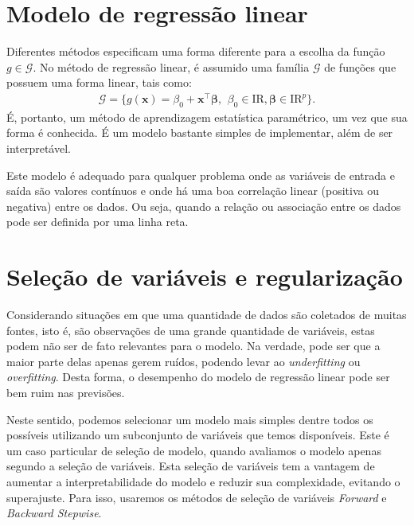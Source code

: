 \documentclass[11pt,]{article}
\begin{document}
\hypertarget{modelo-de-regressuxe3o-linear}{%
\section{Modelo de regressão
linear}\label{modelo-de-regressuxe3o-linear}}

Diferentes métodos especificam uma forma diferente para a escolha da
função \(g \in \mathcal{G}\). No método de regressão linear, é assumido
uma família \(\mathcal{G}\) de funções que possuem uma forma linear,
tais como: \begin{align*}
\mathcal{G} = \{g(\boldsymbol{x}) = \beta_0 + \boldsymbol{x}^\top \boldsymbol{\beta}, \,\ \beta_0 \in \mathrm{I\!R}, \boldsymbol{\beta} \in \mathrm{I\!R}^p \}.
\end{align*} É, portanto, um método de aprendizagem estatística
paramétrico, um vez que sua forma é conhecida. É um modelo bastante
simples de implementar, além de ser interpretável.

Este modelo é adequado para qualquer problema onde as variáveis de
entrada e saída são valores contínuos e onde há uma boa correlação
linear (positiva ou negativa) entre os dados. Ou seja, quando a relação
ou associação entre os dados pode ser definida por uma linha reta.

\hypertarget{seleuxe7uxe3o-de-variuxe1veis-e-regularizauxe7uxe3o}{%
\section{Seleção de variáveis e
regularização}\label{seleuxe7uxe3o-de-variuxe1veis-e-regularizauxe7uxe3o}}

Considerando situações em que uma quantidade de dados são coletados de
muitas fontes, isto é, são observações de uma grande quantidade de
variáveis, estas podem não ser de fato relevantes para o modelo. Na
verdade, pode ser que a maior parte delas apenas gerem ruídos, podendo
levar ao \textit{underfitting} ou \textit{overfitting}. Desta forma, o
desempenho do modelo de regressão linear pode ser bem ruim nas
previsões.

Neste sentido, podemos selecionar um modelo mais simples dentre todos os
possíveis utilizando um subconjunto de variáveis que temos disponíveis.
Este é um caso particular de seleção de modelo, quando avaliamos o
modelo apenas segundo a seleção de variáveis. Esta seleção de variáveis
tem a vantagem de aumentar a interpretabilidade do modelo e reduzir sua
complexidade, evitando o superajuste. Para isso, usaremos os métodos de
seleção de variáveis \textit{Forward} e \textit{Backward Stepwise}.
\end{document}
